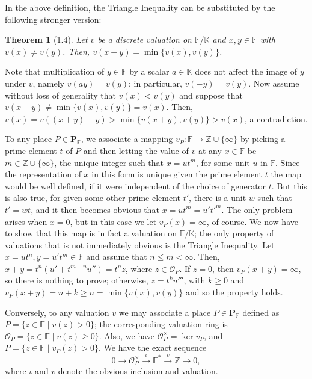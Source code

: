 \documentclass[11pt]{article}
\makeatletter
\theoremstyle{scplain}
\newtheorem*{theorem}{Theorem}
\renewenvironment{proof}[1][\proofname]{%
  \par\pushQED{\qed}\normalfont\topsep6\p@\@plus6\p@\relax
  \trivlist\item[\hskip\labelsep\scshape #1\@addpunct{.}]\ignorespaces}%
  {\popQED\endtrivlist\@endpefalse}
\makeatother
\begin{document}
\noindent
In the above definition, the Triangle Inequality can be substituted by the
following stronger version:

\begin{theorem}[1.4]
Let $v$ be a discrete valuation on $\mathbb{F}/\mathbb{K}$ and $x, y \in \mathbb{F}$
with $v(x) \neq v(y)$. Then, $v(x + y) = \min\{v(x), v(y)\}$.
\end{theorem}

\begin{proof}
Note that multiplication of $y \in \mathbb{F}$ by a scalar $a \in \mathbb{K}$ does
not affect the image of $y$ under $v$, namely $v(ay) = v(y)$; in particular,
$v(-y) = v(y)$. Now assume without loss of generality that $v(x) < v(y)$ and
suppose that $v(x + y) \neq \min\{v(x), v(y)\} = v(x)$. Then,
$v(x) = v((x + y) - y) > \min\{v(x + y), v(y)\} > v(x)$, a contradiction.
\end{proof}

To any place $P \in \mathbf{P}_{\mathbb{F}}$, we associate a mapping
$v_P : \mathbb{F} \longrightarrow \mathbb{Z} \cup \{\infty\}$ by picking a prime
element $t$ of $P$ and then letting the value of $v$ at any $x \in \mathbb{F}$ be
$m \in \mathbb{Z} \cup \{\infty\}$, the unique integer such that $x = u t^m$, for
some unit $u$ in $\mathbb{F}$. Since the representation of $x$ in this form is
unique given the prime element $t$ the map would be well defined, if it were
independent of the choice of generator $t$. But this is also true, for given some
other prime element $t'$, there is a unit $w$ such that $t' = w t$, and it then
becomes obvious that $x = u t^m = u' t'^m$. The only problem arises when $x = 0$,
but in this case we let $v_P(x) = \infty$, of course. We now have to show that
this map is in fact a valuation on $\mathbb{F}/\mathbb{K}$; the only property of
valuations that is not immediately obvious is the Triangle Inequality. Let
$x = u t^n, y = u' t^m \in \mathbb{F}$ and assume that $n \leq m < \infty$. Then,
$x + y = t^n(u' + t^{m-n} u'') = t^n z$, where $z \in \mathcal{O}_P$. If $z = 0$,
then $v_P(x + y) = \infty$, so there is nothing to prove; otherwise,
$z = t^k u'''$, with $k \geq 0$ and
$v_P(x + y) = n + k \geq n = \min\{v(x), v(y)\}$ and so the property holds.

Conversely, to any valuation $v$ we may associate a place
$P \in \mathbf{P}_{\mathbb{F}}$ defined as
$P = \{z \in \mathbb{F} \mid v(z) > 0\}$; the corresponding valuation ring is
$\mathcal{O}_P = \{z \in \mathbb{F} \mid v(z) \geq 0\}$. Also, we have
$\mathcal{O}_P^\times = \ker v_P$, and
$P = \{z \in \mathbb{F} \mid v_P(z) > 0\}$. We have the exact sequence
\[
  0 \longrightarrow \mathcal{O}_P^\times \xrightarrow{\ \iota\ } \mathbb{F}^*
    \xrightarrow{\ v\ } \mathbb{Z} \longrightarrow 0,
\]
where $\iota$ and $v$ denote the obvious inclusion and valuation.
\end{document}
